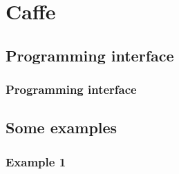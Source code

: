 
\section{Caffe}\label{sec:Caffe}

\subsection{Programming interface}

\begin{frame}
  \MyLogo
  \frametitle{Programming interface}  

\end{frame}

\subsection{Some examples}

\begin{frame}
  \MyLogo
  \frametitle{Example 1}  

\end{frame}